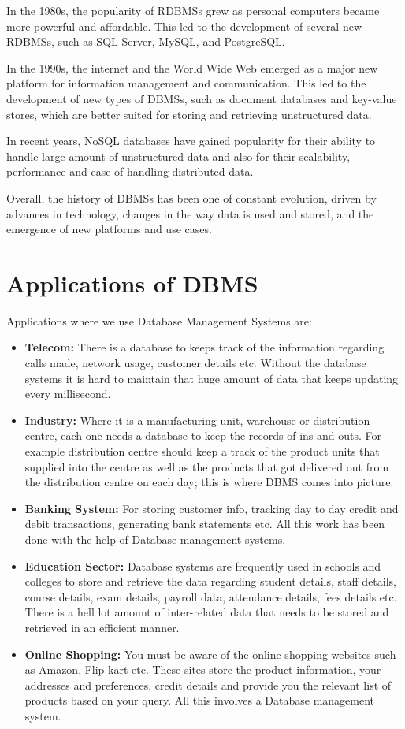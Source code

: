 In the 1980s, the popularity of RDBMSs grew as personal computers became more powerful and affordable. This led to the development of several new RDBMSs, such as SQL Server, MySQL, and PostgreSQL.

In the 1990s, the internet and the World Wide Web emerged as a major new platform for information management and communication. This led to the development of new types of DBMSs, such as document databases and key-value stores, which are better suited for storing and retrieving unstructured data.

In recent years, NoSQL databases have gained popularity for their ability to handle large amount of unstructured data and also for their scalability, performance and ease of handling distributed data.

Overall, the history of DBMSs has been one of constant evolution, driven by advances in technology, changes in the way data is used and stored, and the emergence of new platforms and use cases.

\section{Applications of DBMS}
Applications where we use Database Management Systems are: \\
\begin{itemize}
\item \textbf{Telecom:} There is a database to keeps track of the information regarding calls made, network usage, customer details etc. Without the database systems it is hard to
maintain that huge amount of data that keeps updating every millisecond.
\item \textbf{Industry:} Where it is a manufacturing unit, warehouse or distribution centre, each one needs a database to keep the records of ins and outs. For example distribution
centre should keep a track of the product units that supplied into the centre as well as
the products that got delivered out from the distribution centre on each day; this is
where DBMS comes into picture.
\item \textbf{Banking System: } For storing customer info, tracking day to day credit and debit
transactions, generating bank statements etc. All this work has been done with the help
of Database management systems.
\item \textbf{Education Sector: } Database systems are frequently used in schools and colleges to store and retrieve the data regarding student details, staff details, course details, exam
details, payroll data, attendance details, fees details etc. There is a hell lot amount of
inter-related data that needs to be stored and retrieved in an efficient manner.
\item \textbf{Online Shopping: }You must be aware of the online shopping websites such as
Amazon, Flip kart etc. These sites store the product information, your addresses and
preferences, credit details and provide you the relevant list of products based on your
query. All this involves a Database management system.
\end{itemize}

